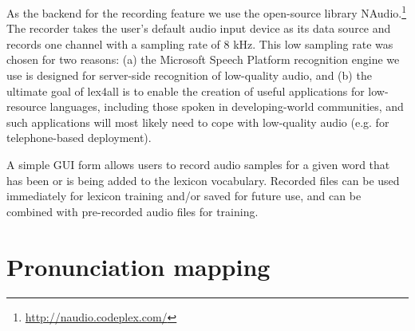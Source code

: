 \documentclass[11pt]{article}
\begin{document}
As the backend for the recording feature we use the open-source library NAudio.\footnote{\url{http://naudio.codeplex.com/}}
The recorder takes the user's default audio input device as its data source and records one channel with a sampling rate of 8 kHz. 
This low sampling rate was chosen for two reasons: (a) the Microsoft Speech Platform recognition engine we use is designed for server-side recognition of low-quality audio, and (b) the ultimate goal of lex4all is to enable the creation of useful applications for low-resource languages, including those spoken in developing-world communities, and such applications will most likely need to cope with low-quality audio (e.g. for telephone-based deployment).

A simple GUI form allows users to record audio samples for a given word that has been or is being added to the lexicon vocabulary. Recorded files can be used immediately for lexicon training and/or saved for future use, and can be combined with pre-recorded audio files for training. 




\section{Pronunciation mapping}
\label{sec:backend}
\end{document}
